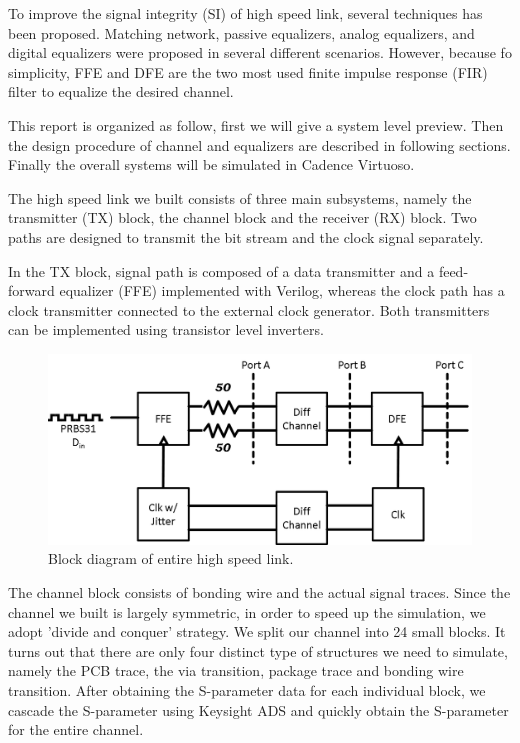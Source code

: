 \documentclass{book}  %
\renewcommand{\section}[1]{\psection{#1}}
\begin{document}
\begin{paper}
To improve the signal integrity (SI) of high speed link, several techniques has been proposed. Matching network, passive equalizers, analog equalizers, and digital equalizers were proposed in several different scenarios. However, because fo simplicity, FFE and DFE are the two most used finite impulse response (FIR) filter to equalize the desired channel.

This report is organized as follow, first we will give a system level preview. Then the design procedure of channel and equalizers are described in following sections. Finally the overall systems will be simulated in Cadence Virtuoso. 


\section{System Level Design}
\label{sec:system}
The high speed link we built consists of three main subsystems, namely the transmitter (TX) block, the channel block and the receiver (RX) block. Two paths are designed to transmit the bit stream and the clock signal separately. 

In the TX block, signal path is composed of a data transmitter and a feed-forward equalizer (FFE) implemented with Verilog, whereas the clock path has a clock transmitter connected to the external clock generator. Both transmitters can be implemented using transistor level inverters.

\begin{figure}[htbp!]
	\centering
	\includegraphics[width=0.8\columnwidth]{./img/system_box_model.png}
	\caption{Block diagram of entire high speed link.}
\end{figure}


The channel block consists of bonding wire and the actual signal traces. Since the channel we built is largely symmetric, in order to speed up the simulation, we adopt 'divide and conquer' strategy. We split our channel into 24 small blocks. It turns out that there are only four distinct type of structures we need to simulate, namely the PCB trace, the via transition, package trace and bonding wire transition. After obtaining the S-parameter data for each individual block, we cascade the S-parameter using Keysight ADS and quickly obtain the S-parameter for the entire channel. 


\end{paper}
\end{document}
